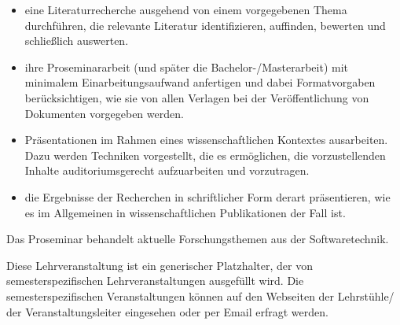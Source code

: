 \begin{course}
\begin{learningoutcomes}
 \begin{itemize}\item eine Literaturrecherche ausgehend von einem vorgegebenen Thema durchführen, die relevante Literatur identifizieren, auffinden, bewerten und schließlich auswerten.  \item ihre Proseminararbeit (und später die Bachelor-/Masterarbeit) mit minimalem Einarbeitungsaufwand anfertigen und dabei Formatvorgaben berücksichtigen, wie sie von allen Verlagen bei der Veröffentlichung von Dokumenten vorgegeben werden.  \item Präsentationen im Rahmen eines wissenschaftlichen Kontextes ausarbeiten. Dazu werden Techniken vorgestellt, die es ermöglichen, die vorzustellenden Inhalte auditoriumsgerecht aufzuarbeiten und vorzutragen.  \item die Ergebnisse der Recherchen in schriftlicher Form derart präsentieren, wie es im Allgemeinen in wissenschaftlichen Publikationen der Fall ist.  \end{itemize}
\end{learningoutcomes}

\begin{content}
Das Proseminar behandelt aktuelle Forschungsthemen aus der Softwaretechnik.


\end{content}





\begin{remarks}Diese Lehrveranstaltung ist ein generischer Platzhalter, der von semesterspezifischen Lehrveranstaltungen ausgefüllt wird. Die semesterspezifischen Veranstaltungen können auf den Webseiten der Lehrstühle/ der Veranstaltungsleiter eingesehen oder per Email erfragt werden.

\end{remarks}

\end{course}